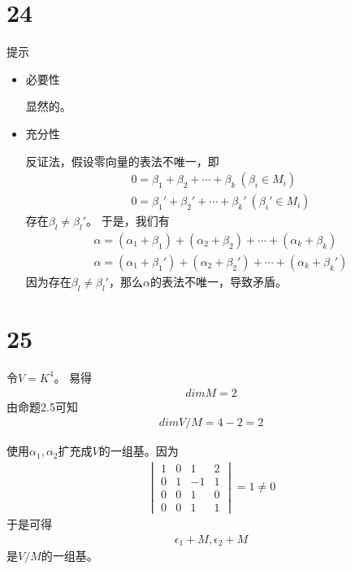 \documentclass{article}
\begin{document}
\section*{24}

提示
\begin{itemize}
  \item 必要性

        显然的。

  \item 充分性

        反证法，假设零向量的表法不唯一，即
        \begin{align*}
          0 = \beta_1 + \beta_2 + \cdots + \beta_k \ (\beta_i \in M_i) \\
          0 = \beta_1' + \beta_2' + \cdots + \beta_k' \ (\beta_i' \in M_i)
        \end{align*}
        存在$\beta_l \neq \beta_l'$。
        于是，我们有
        \begin{align*}
          \alpha = (\alpha_1 + \beta_1) + (\alpha_2 + \beta_2) + \cdots + (\alpha_k + \beta_k) \\
          \alpha = (\alpha_1 + \beta_1') + (\alpha_2 + \beta_2') + \cdots + (\alpha_k + \beta_k')
        \end{align*}
        因为存在$\beta_l \neq \beta_l'$，那么$\alpha$的表法不唯一，导致矛盾。
\end{itemize}

\section*{25}

令$V = K^4$。
易得
\begin{align*}
  dim M = 2
\end{align*}
由命题2.5可知
\begin{align*}
  dim V/M = 4 - 2 = 2
\end{align*}

使用$\alpha_1, \alpha_2$扩充成$V$的一组基。因为
\begin{align*}
  \begin{vmatrix}
    1 & 0 & 1  & 2 \\
    0 & 1 & -1 & 1 \\
    0 & 0 & 1  & 0 \\
    0 & 0 & 1  & 1
  \end{vmatrix}
  = 1 \neq 0
\end{align*}
于是可得
\begin{align*}
  \epsilon_1 + M, \epsilon_2 + M
\end{align*}
是$V/M$的一组基。
\end{document}
